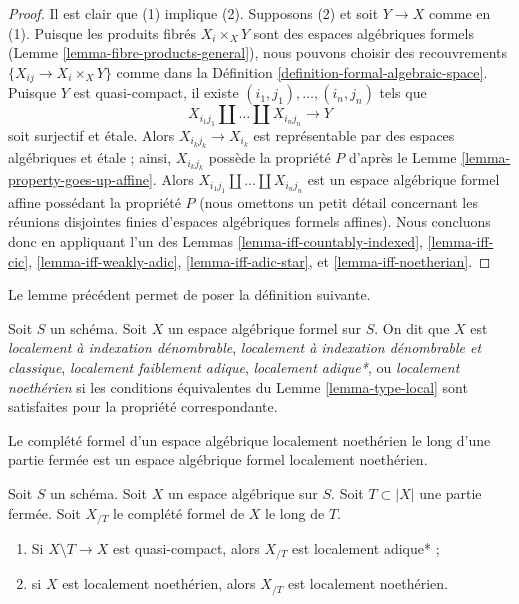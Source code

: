 \begin{proof}
Il est clair que (1) implique (2). Supposons (2) et soit
$Y \to X$ comme en (1). Puisque les produits fibrés $X_i \times_X Y$
sont des espaces algébriques formels (Lemme \ref{lemma-fibre-products-general}),
nous pouvons choisir des recouvrements $\{X_{ij} \to X_i \times_X Y\}$ comme dans la
Définition \ref{definition-formal-algebraic-space}.
Puisque $Y$ est quasi-compact, il existe
$(i_1, j_1), \ldots, (i_n, j_n)$ tels que
$$
X_{i_1 j_1} \amalg \ldots \amalg X_{i_n j_n} \longrightarrow Y
$$
soit surjectif et étale. Alors $X_{i_kj_k} \to X_{i_k}$ est représentable
par des espaces algébriques et étale ; ainsi, $X_{i_kj_k}$ possède la propriété $P$ d'après le
Lemme \ref{lemma-property-goes-up-affine}.
Alors $X_{i_1 j_1} \amalg \ldots \amalg X_{i_n j_n}$ est un
espace algébrique formel affine possédant la propriété $P$ (nous omettons un petit détail
concernant les réunions disjointes finies d'espaces algébriques formels affines).
Nous concluons donc en appliquant l'un des
Lemmas \ref{lemma-iff-countably-indexed},
\ref{lemma-iff-cic},
\ref{lemma-iff-weakly-adic},
\ref{lemma-iff-adic-star}, et
\ref{lemma-iff-noetherian}.
\end{proof}

\noindent
Le lemme précédent permet de poser la définition suivante.

\begin{definition}
\label{definition-types-formal-algebraic-spaces}
Soit $S$ un schéma. Soit $X$ un espace algébrique formel sur $S$.
On dit que $X$ est
{\it localement à indexation dénombrable},
{\it localement à indexation dénombrable et classique},
{\it localement faiblement adique},
{\it localement adique*}, ou
{\it localement noethérien}
si les conditions équivalentes du Lemme \ref{lemma-type-local}
sont satisfaites pour la propriété correspondante.
\end{definition}

\noindent
Le complété formel d'un espace algébrique localement noethérien
le long d'une partie fermée est un espace algébrique formel localement noethérien.

\begin{lemma}
\label{lemma-formal-completion-types}
Soit $S$ un schéma. Soit $X$ un espace algébrique sur $S$.
Soit $T \subset |X|$ une partie fermée. Soit $X_{/T}$ le
complété formel de $X$ le long de $T$.
\begin{enumerate}
\item Si $X \setminus T \to X$ est quasi-compact,
alors $X_{/T}$ est localement adique* ;
\item si $X$ est localement noethérien, alors $X_{/T}$ est localement
noethérien.
\end{enumerate}
\end{lemma}


